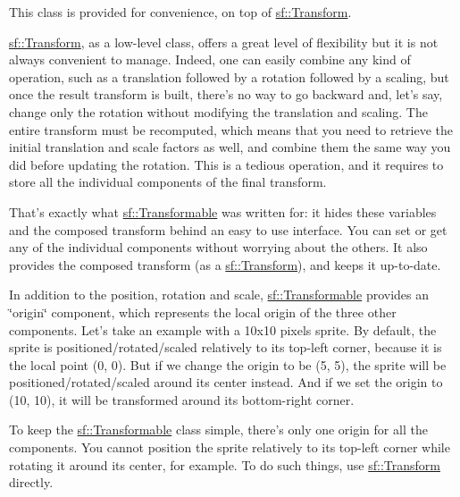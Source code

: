 This class is provided for convenience, on top of \hyperlink{classsf_1_1_transform}{sf\-::\-Transform}.

\hyperlink{classsf_1_1_transform}{sf\-::\-Transform}, as a low-\/level class, offers a great level of flexibility but it is not always convenient to manage. Indeed, one can easily combine any kind of operation, such as a translation followed by a rotation followed by a scaling, but once the result transform is built, there's no way to go backward and, let's say, change only the rotation without modifying the translation and scaling. The entire transform must be recomputed, which means that you need to retrieve the initial translation and scale factors as well, and combine them the same way you did before updating the rotation. This is a tedious operation, and it requires to store all the individual components of the final transform.

That's exactly what \hyperlink{classsf_1_1_transformable}{sf\-::\-Transformable} was written for\-: it hides these variables and the composed transform behind an easy to use interface. You can set or get any of the individual components without worrying about the others. It also provides the composed transform (as a \hyperlink{classsf_1_1_transform}{sf\-::\-Transform}), and keeps it up-\/to-\/date.

In addition to the position, rotation and scale, \hyperlink{classsf_1_1_transformable}{sf\-::\-Transformable} provides an \char`\"{}origin\char`\"{} component, which represents the local origin of the three other components. Let's take an example with a 10x10 pixels sprite. By default, the sprite is positioned/rotated/scaled relatively to its top-\/left corner, because it is the local point (0, 0). But if we change the origin to be (5, 5), the sprite will be positioned/rotated/scaled around its center instead. And if we set the origin to (10, 10), it will be transformed around its bottom-\/right corner.

To keep the \hyperlink{classsf_1_1_transformable}{sf\-::\-Transformable} class simple, there's only one origin for all the components. You cannot position the sprite relatively to its top-\/left corner while rotating it around its center, for example. To do such things, use \hyperlink{classsf_1_1_transform}{sf\-::\-Transform} directly.

